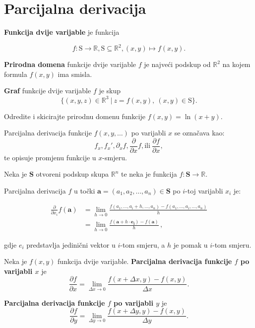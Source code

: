 \section{Parcijalna derivacija}

\textbf{Funkcija dvije varijable} je funkcija

$$
f: \mathrm{S} \to \mathbb{R}, \mathrm{S} \subseteq \mathbb{R}^2, (x, y) \mapsto f(x,y).
$$

\textbf{Prirodna domena} funkcije dvije varijable $f$ je najveći podskup od
$\mathbb{R}^2$ na kojem formula $f(x,y)$ ima smisla.

\textbf{Graf} funkcije dvije varijable $f$ je skup
$$
  \{(x,y,z)\in\mathbb{R}^3\ |\ z=f(x,y),\ (x,y)\in\mathrm{S}\}.
$$

\begin{example}
  Odredite i skicirajte prirodnu domenu funkcije $f(x,y)=\ln(x+y)$.
\end{example}

Parcijalna derivacija funkcije $f(x,y,\dots)$ po varijabli $x$ se označava kao:
$$
f_x, f_x', \partial_x f, \frac{\partial}{\partial x}f, \text{ili}\ \frac{\partial f}{\partial x},
$$
te opisuje promjenu funkcije u $x$-smjeru.

\begin{definition}
    \label{def:diff_partial}
    Neka je $\mathbf{S}$ otvoreni podskup skupa $\mathbb{R}^n$ te neka je
    funkcija $f:\mathbf{S}\to \mathbb{R}$.

    Parcijalna derivacija $f$ u točki $\mathbf{a}=(a_1, a_2, \dots,
    a_n)\in\mathbf{S}$ po $i$-toj varijabli $x_i$ je:
    
    \begin{align*}
        \frac{\partial }{\partial x_i }f(\mathbf{a}) & = \lim_{h \to 0} \frac{f(a_1, \ldots , a_i+h, \ldots ,a_n) -
        f(a_1, \ldots, a_i, \dots ,a_n)}{h} \\ 
        & = \lim_{h \to 0} \frac{f(\mathbf{a}+h \cdot \mathbf{e_i}) - f(\mathbf{a})}{h}\,,
    \end{align*}

    gdje $e_i$ predstavlja jedinični vektor u $i$-tom smjeru, a $h$ je pomak u
    $i$-tom smjeru.
\end{definition}

Neka je $f(x,y)$ funkcija dvije varijable. \textbf{Parcijalna derivacija
funkcije $f$ po varijabli $x$} je
$$
  \frac{\partial f}{\partial x} = \lim_{\Delta x\to 0} \frac{f(x+\Delta x,y)-f(x,y)}{\Delta x}.
$$

\textbf{Parcijalna derivacija funkcije $f$ po varijabli $y$} je
$$
  \frac{\partial f}{\partial y} = \lim_{\Delta y\to 0} \frac{f(x+\Delta y,y)-f(x,y)}{\Delta y}.
$$

